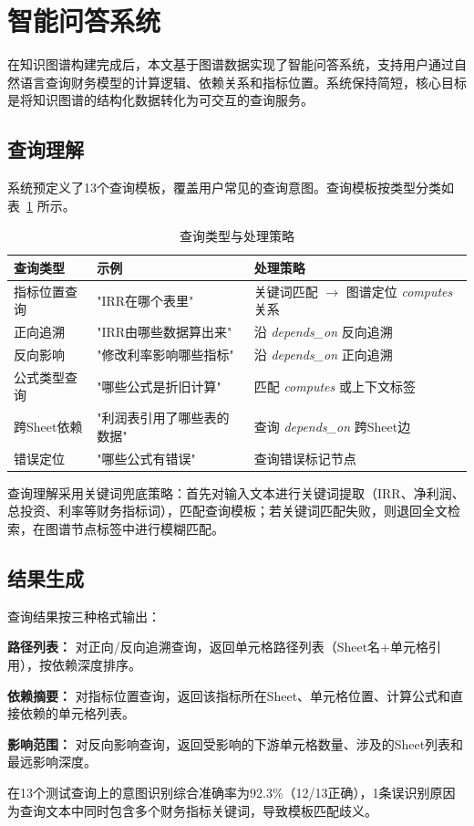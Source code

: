 \section{\heiti 智能问答系统}

在知识图谱构建完成后，本文基于图谱数据实现了智能问答系统，支持用户通过自然语言查询财务模型的计算逻辑、依赖关系和指标位置。系统保持简短，核心目标是将知识图谱的结构化数据转化为可交互的查询服务。

\subsection{\heiti 查询理解}

系统预定义了13个查询模板，覆盖用户常见的查询意图。查询模板按类型分类如表~\ref{tab:query_templates} 所示。

\begin{table}[H]
	\centering
	\caption{查询类型与处理策略}
	\label{tab:query_templates}
	\vspace {-2.5mm}
	\begin{center}
		\begin{tabular}{p{26mm}p{52mm}p{42mm}}
			\toprule
			查询类型 & 示例 & 处理策略 \\
			\hline
			指标位置查询 & "IRR在哪个表里" & 关键词匹配 $\to$ 图谱定位 \textit{computes} 关系 \\
			正向追溯 & "IRR由哪些数据算出来" & 沿 \textit{depends\_on} 反向追溯 \\
			反向影响 & "修改利率影响哪些指标" & 沿 \textit{depends\_on} 正向追溯 \\
			公式类型查询 & "哪些公式是折旧计算" & 匹配 \textit{computes} 或上下文标签 \\
			跨Sheet依赖 & "利润表引用了哪些表的数据" & 查询 \textit{depends\_on} 跨Sheet边 \\
			错误定位 & "哪些公式有错误" & 查询错误标记节点 \\
			\bottomrule
		\end{tabular}
	\end{center}
\end{table}

查询理解采用关键词兜底策略：首先对输入文本进行关键词提取（IRR、净利润、总投资、利率等财务指标词），匹配查询模板；若关键词匹配失败，则退回全文检索，在图谱节点标签中进行模糊匹配。

\subsection{\heiti 结果生成}

查询结果按三种格式输出：

\textbf{路径列表：} 对正向/反向追溯查询，返回单元格路径列表（Sheet名+单元格引用），按依赖深度排序。

\textbf{依赖摘要：} 对指标位置查询，返回该指标所在Sheet、单元格位置、计算公式和直接依赖的单元格列表。

\textbf{影响范围：} 对反向影响查询，返回受影响的下游单元格数量、涉及的Sheet列表和最远影响深度。

在13个测试查询上的意图识别综合准确率为92.3\%（12/13正确），1条误识别原因为查询文本中同时包含多个财务指标关键词，导致模板匹配歧义。
